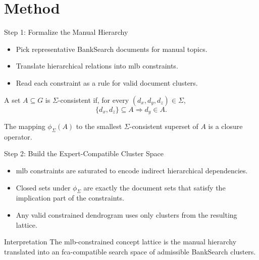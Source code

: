 \section{Method}

\begin{frame}{Step 1: Formalize the Manual Hierarchy}
\begin{itemize}
    \item Pick representative BankSearch documents for manual topics.
    \item Translate hierarchical relations into \ac{mlb} constraints.
    \item Read each constraint as a rule for valid document clusters.
\end{itemize}

\vspace{0.4em}
\begin{definition}
A set $A\subseteq G$ is $\Sigma$-consistent if, for every $(d_x,d_y,d_z)\in\Sigma$,
\[
\{d_x,d_z\}\subseteq A \Rightarrow d_y\in A.
\]
\end{definition}

\begin{theorem}
The mapping $\phi_{\Sigma}(A)$ to the smallest $\Sigma$-consistent superset of $A$ is a closure operator.
\end{theorem}
\end{frame}

\begin{frame}{Step 2: Build the Expert-Compatible Cluster Space}
\begin{itemize}
    \item \ac{mlb} constraints are saturated to encode indirect hierarchical dependencies.
    \item Closed sets under $\phi_{\Sigma}$ are exactly the document sets that satisfy the implication part of the constraints.
    \item Any valid constrained dendrogram uses only clusters from the resulting lattice.
\end{itemize}

\begin{block}{Interpretation}
The \ac{mlb}-constrained concept lattice is the manual hierarchy translated into an \ac{fca}-compatible search space of admissible BankSearch clusters.
\end{block}
\end{frame}


